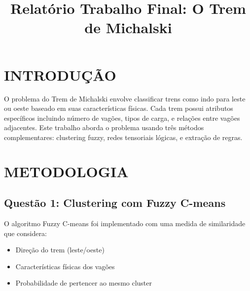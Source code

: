 \documentclass[a4paper,twoside]{article}
\begin{document}
\title{Relat\'orio Trabalho Final: O Trem de Michalski}

\author{}



\onecolumn \maketitle \normalsize \setcounter{footnote}{0} \vfill

\section{\uppercase{Introdu\c{c}\~ao}}
\label{sec:introduction}

O problema do Trem de Michalski envolve classificar trens como indo para leste ou oeste baseado em suas caracter\'isticas f\'isicas. Cada trem possui atributos espec\'ificos incluindo n\'umero de vag\~oes, tipos de carga, e rela\c{c}\~oes entre vag\~oes adjacentes. Este trabalho aborda o problema usando tr\^es m\'etodos complementares: clustering fuzzy, redes tensoriais l\'ogicas, e extra\c{c}\~ao de regras.

\section{\uppercase{Metodologia}}
\label{sec:methodology}

\subsection{Quest\~ao 1: Clustering com Fuzzy C-means}

O algoritmo Fuzzy C-means foi implementado com uma medida de similaridade que considera:

\begin{itemize}
    \item Dire\c{c}\~ao do trem (leste/oeste)
    \item Caracter\'isticas f\'isicas dos vag\~oes
    \item Probabilidade de pertencer ao mesmo cluster
\end{itemize}
\end{document}
